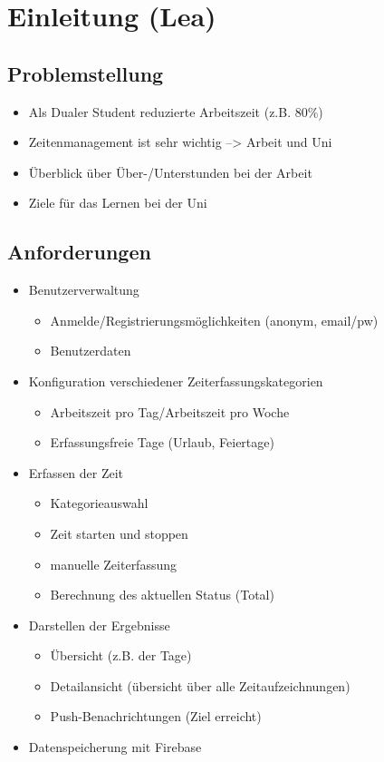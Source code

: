 \section{Einleitung (Lea)}\label{sec:einleitung}
\subsection{Problemstellung}
\begin{itemize}
    \item Als Dualer Student reduzierte Arbeitszeit (z.B. 80\%)
    \item Zeitenmanagement ist sehr wichtig --> Arbeit und Uni
    \item Überblick über Über-/Unterstunden bei der Arbeit
    \item Ziele für das Lernen bei der Uni
\end{itemize}

\subsection{Anforderungen}
\begin{itemize}
    \item Benutzerverwaltung
    \begin{itemize}
        \item Anmelde/Registrierungsmöglichkeiten (anonym, email/pw)
        \item Benutzerdaten
    \end{itemize}
    \item Konfiguration verschiedener Zeiterfassungskategorien
    \begin{itemize}
        \item Arbeitszeit pro Tag/Arbeitszeit pro Woche
        \item Erfassungsfreie Tage (Urlaub, Feiertage)
    \end{itemize}
    \item Erfassen der Zeit
    \begin{itemize}
        \item Kategorieauswahl
        \item Zeit starten und stoppen
        \item manuelle Zeiterfassung
        \item Berechnung des aktuellen Status (Total)
    \end{itemize}
    \item Darstellen der Ergebnisse
    \begin{itemize}
        \item Übersicht (z.B. der Tage)
        \item Detailansicht (übersicht über alle Zeitaufzeichnungen)
        \item Push-Benachrichtungen (Ziel erreicht)
    \end{itemize}
    \item Datenspeicherung mit Firebase
\end{itemize}
